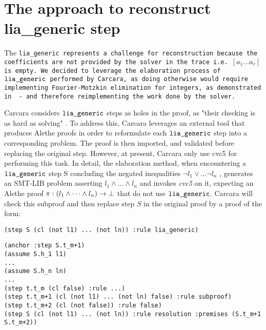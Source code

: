 \section{The approach to reconstruct lia\_generic step}
\label{sec:elaboration-lia}

The \tt{lia\_generic} represents a challenge for reconstruction because the coefficients are not provided by the solver in the trace i.e. \colorbox{orange!30}{$[a_1 \dots a_r]$} is empty.
We decided to leverage the elaboration process of $\tt{lia\_generic}$ performed by Carcara, as doing otherwise would require implementing Fourier-Motzkin elimination for integers, as demonstrated in \cite{omegatest,micromega} -
and therefore reimplementing the work done by the solver.

Carcara considers $\tt{lia\_generic}$ steps as holes in the proof,  as "their checking is as hard as solving" \cite[\S 3.2]{carcara}.
To address this, Carcara leverages an external tool that produces Alethe proofs in order to reformulate each $\tt{lia\_generic}$ step into a corresponding problem. 
The proof is then imported, and validated before replacing the original step. However, at present, Carcara only use cvc5 for performing this task.
In detail, the elaboration method, when encountering a $\tt{lia\_generic}$ step S concluding the negated inequalities $ \neg l_1 \lor \dots \neg l_n$ , generates an SMT-LIB problem asserting $l_1 \land \dots \land l_n$ and invokes \emph{cvc5} on it, expecting an Alethe proof $\pi : (l_1 \land \dots \land l_n) \ra \bot$
that do not use $\tt{lia\_generic}$. Carcara will check this subproof and then replace step $S$ in the original proof by a proof of the form:

\begin{lstlisting}[language=SMT]
(step S (cl (not l1) ... (not ln)) :rule lia_generic)
\end{lstlisting}

\begin{center}
\lightning
\end{center}

\begin{lstlisting}[language=SMT,caption={Elaboration of $\tt{lia\_generic}$},label={lst:elab_lia}]
(anchor :step S.t_m+1)
(assume S.h_1 l1)
...
(assume S.h_n ln)
...
(step t.t_m (cl false) :rule ...)
(step t.t_m+1 (cl (not l1) ... (not ln) false) :rule subproof)
(step t.t_m+2 (cl (not false)) :rule false)
(step S (cl (not l1) ... (not ln)) :rule resolution :premises (S.t_m+1 S.t_m+2))
\end{lstlisting}

